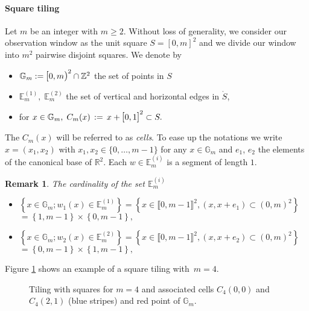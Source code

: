 \documentclass[12pt]{article}
\theoremstyle{Theorem}
\newtheorem{remark}{Remark}
\begin{document}
\paragraph{Square tiling}
Let $m$ be an integer with $m \geq 2$. Without loss of generality, we consider our observation window as the unit square $S = [0,m]^{2}$ and  we divide our window into $m^{2}$ pairwise disjoint squares. We denote by 
\begin{itemize}
\item $\mathbb{G}_{m} := \text{\larger[1]{$[$}}0, m \text{\larger[1]{$)$}}^{2} \cap \mathbb{Z}^{2}$ the set of points in $S$
\item $\mathbb{E}^{(1)}_{m}, \; \mathbb{E}^{(2)}_{m} $ the set of vertical and horizontal edges in $\mathring{S}$,
\item for $x\in \mathbb{G}_{m}, \; C_{m}(x) \, := \,x + \text{\larger[1]{$[$}}0, 1 \text{\larger[1]{$]$}}^{2} \subset S.$
\end{itemize}
The $C_{m}(x)$ will be referred to as \textit{cells}. To ease up the notations we write $x = (x_1, x_2)$ with $x_1, x_2 \in \{0,\ldots, m-1\}$ for any $x\in \mathbb{G}_{m}$ and $e_1$, $e_{2}$ the elements of the canonical base of $\mathbb{R}^{2}$.
Each $w \in \mathbb{E}^{(i)}_{m}$ is a segment of length $1$. 
\begin{remark} The cardinality of the set $\mathbb{E}^{\scriptscriptstyle  (i)}_{m}$
\label{cardEm}
\begin{itemize}
\item 
$\left\{ x \in \mathbb{G}_{m}; w_{1}(x) \in \mathbb{E}^{\scriptscriptstyle  (1)}_{m}\right\} = \left\{x \in \llbracket 0, m-1 \rrbracket^{2}, (x, x+e_1)\subset (0,m)^{2} \right\} $\\ 
 \hspace*{4.25cm}$ =  \left\{ 1, m - 1\right\}\times\left\{ 0, m-1 \right\},$
\item$\left\{ x \in \mathbb{G}_{m}; w_{2}(x) \in \mathbb{E}^{\scriptscriptstyle  (2)}_{m}\right\}  = \left\{x \in \llbracket 0, m-1 \rrbracket^{2}, (x, x+e_2)\subset (0,m)^{2} \right\} $\\ 
 \hspace*{4.25cm}$ = \left\{ 0, m-1 \right\} \times \left\{ 1, m - 1\right\},$
\end{itemize}
\end{remark}
Figure \ref{fig1} shows an example of a square tiling with~$m = 4$.
\begin{figure}[h]
\begin{center}
\end{center}
\vspace{-0.25cm}
\caption{Tiling with squares for $m = 4$ and associated cells $C_{4}(0,0)$ and $C_{4}(2,1)$ (blue stripes) and red point of $\mathbb{G}_{m}$.}
\label{fig1}
\end{figure}
\vspace{-0.5cm}
\end{document}
